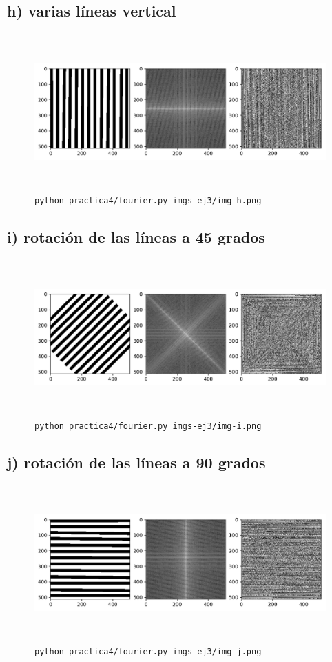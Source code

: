 \documentclass[11pt, spanish]{article}
\begin{document}
\subsection{h) varias líneas vertical}
\begin{figure}[H]
\centering
  \includegraphics[height=6cm]{informe-imgs/ej3-h.pdf}
  \caption{\texttt{python practica4/fourier.py imgs-ej3/img-h.png}}
\end{figure}

\subsection{i) rotación de las líneas a 45 grados}
\begin{figure}[H]
\centering
  \includegraphics[height=6cm]{informe-imgs/ej3-i.pdf}
  \caption{\texttt{python practica4/fourier.py imgs-ej3/img-i.png}}
\end{figure}

\subsection{j) rotación de las líneas a 90 grados}
\begin{figure}[H]
\centering
  \includegraphics[height=6cm]{informe-imgs/ej3-j.pdf}
  \caption{\texttt{python practica4/fourier.py imgs-ej3/img-j.png}}
\end{figure}
\end{document}
